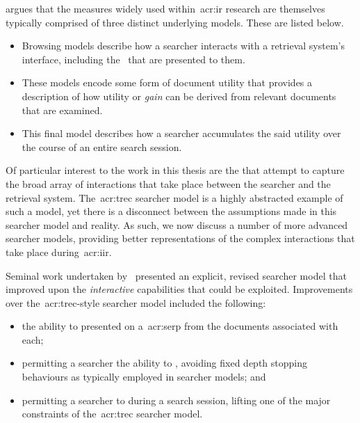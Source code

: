 \cite{carterette2011effectiveness_evaluation} argues that the measures widely used within~\gls{acr:ir} research are themselves typically comprised of three distinct underlying models. These are listed below.

\begin{itemize}
    \item{ Browsing models describe how a searcher interacts with a retrieval system's interface, including the~ that are presented to them.}
    \item{ These models encode some form of document utility that provides a description of how utility or \emph{gain} can be derived from relevant documents that are examined.}
    \item{ This final model describes how a searcher accumulates the said utility over the course of an entire search session.}
\end{itemize}

Of particular interest to the work in this thesis are the  that attempt to capture the broad array of interactions that take place between the searcher and the retrieval system. The~\gls{acr:trec} searcher model is a highly abstracted example of such a model, yet there is a disconnect between the assumptions made in this searcher model and reality. As such, we now discuss a number of more advanced searcher models, providing better representations of the complex interactions that take place during~\gls{acr:iir}.

Seminal work undertaken by~\cite{baskaya2013behavioural_factors} presented an explicit, revised searcher model that improved upon the \emph{interactive} capabilities that could be exploited. Improvements over the~\gls{acr:trec}-style searcher model included the following:

\begin{itemize}
    \item{the ability to  presented on a~\gls{acr:serp} from the documents associated with each;}
    \item{permitting a searcher the ability to , avoiding fixed depth stopping behaviours as typically employed in searcher models; and}
    \item{permitting a searcher to  during a search session, lifting one of the major constraints of the~\gls{acr:trec} searcher model.}
\end{itemize}

